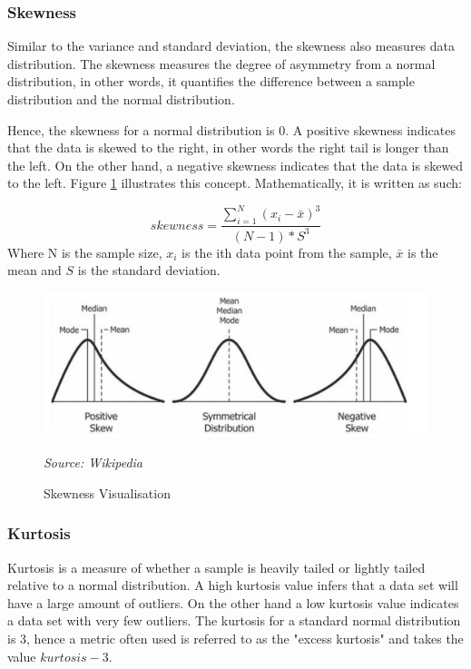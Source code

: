 \subsubsection{Skewness}

Similar to the variance and standard deviation, the skewness also measures data distribution. The skewness measures the degree of asymmetry from a normal distribution, in other words, it quantifies the difference between a sample distribution and the normal distribution.

Hence, the skewness for a normal distribution is 0. A positive skewness indicates that the data is skewed to the right, in other words the right tail is longer than the left. On the other hand, a negative skewness indicates that the data is skewed to the left. Figure \ref{skewness fig} illustrates this concept. Mathematically, it is written as such:

\begin{equation}
    skewness = \frac{\sum_{i=1}^{N}(x_{i} - \bar{x})^{3}}{(N - 1) * S^{3}}
\end{equation}
Where N is the sample size, $x_{i}$ is the ith data point from the sample, $\bar{x}$ is the mean and $S$ is the standard deviation.

\begin{figure}[h!]
      \centering
      \includegraphics[scale=0.8]{lit_review/skewness.png}
      \caption{Skewness Visualisation}
      \label{skewness fig}
      \emph{Source: Wikipedia}
\end{figure}

\subsubsection{Kurtosis}

Kurtosis is a measure of whether a sample is heavily tailed or lightly tailed relative to a normal distribution. A high kurtosis value infers that a data set will have a large amount of outliers. On the other hand a low kurtosis value indicates a data set with very few outliers. The kurtosis for a standard normal distribution is 3, hence a metric often used is referred to as the "excess kurtosis" and takes the value $kurtosis - 3$.


